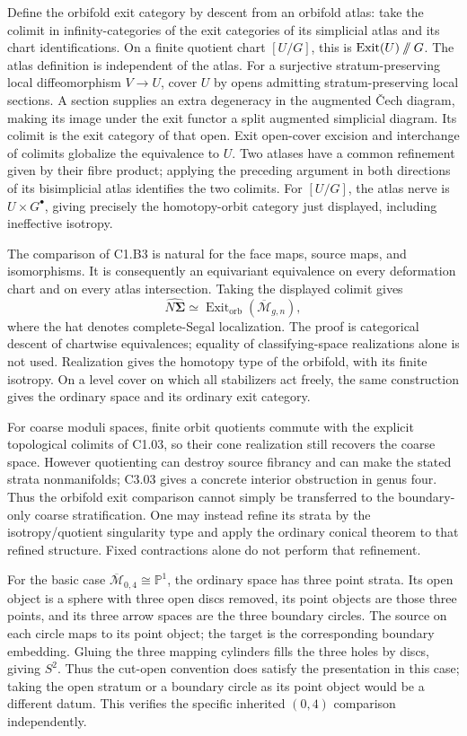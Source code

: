 Define the orbifold exit category by descent from an orbifold atlas: take the colimit in infinity-categories of the exit categories of its simplicial atlas and its chart identifications. On a finite quotient chart \([U/G]\), this is \(\operatorname{Exit}(U)\mathbin{/\mkern-6mu/}G\). The atlas definition is independent of the atlas. For a surjective stratum-preserving local diffeomorphism \(V\to U\), cover \(U\) by opens admitting stratum-preserving local sections. A section supplies an extra degeneracy in the augmented \v{C}ech diagram, making its image under the exit functor a split augmented simplicial diagram. Its colimit is the exit category of that open. Exit open-cover excision \cite[Theorem A.7.1]{LurieHA} and interchange of colimits globalize the equivalence to \(U\). Two atlases have a common refinement given by their fibre product; applying the preceding argument in both directions of its bisimplicial atlas identifies the two colimits. For \([U/G]\), the atlas nerve is \(U\times G^\bullet\), giving precisely the homotopy-orbit category just displayed, including ineffective isotropy.

The comparison of C1.B3 is natural for the face maps, source maps, and isomorphisms. It is consequently an equivariant equivalence on every deformation chart and on every atlas intersection. Taking the displayed colimit gives \[
 \widehat{N\boldsymbol\Sigma}\simeq
 \operatorname{Exit}_{\mathrm{orb}}(\overline{\mathcal M}_{g,n}),
\] where the hat denotes complete-Segal localization. The proof is categorical descent of chartwise equivalences; equality of classifying-space realizations alone is not used. Realization gives the homotopy type of the orbifold, with its finite isotropy. On a level cover on which all stabilizers act freely, the same construction gives the ordinary space and its ordinary exit category.

For coarse moduli spaces, finite orbit quotients commute with the explicit topological colimits of C1.03, so their cone realization still recovers the coarse space. However quotienting can destroy source fibrancy and can make the stated strata nonmanifolds; C3.03 gives a concrete interior obstruction in genus four. Thus the orbifold exit comparison cannot simply be transferred to the boundary-only coarse stratification. One may instead refine its strata by the isotropy/quotient singularity type and apply the ordinary conical theorem to that refined structure. Fixed contractions alone do not perform that refinement.

For the basic case \(\overline{\mathcal M}_{0,4}\cong\mathbb P^1\), the ordinary space has three point strata. Its open object is a sphere with three open discs removed, its point objects are those three points, and its three arrow spaces are the three boundary circles. The source on each circle maps to its point object; the target is the corresponding boundary embedding. Gluing the three mapping cylinders fills the three holes by discs, giving \(S^2\). Thus the cut-open convention does satisfy the presentation in this case; taking the open stratum or a boundary circle as its point object would be a different datum. This verifies the specific inherited \((0,4)\) comparison independently.

